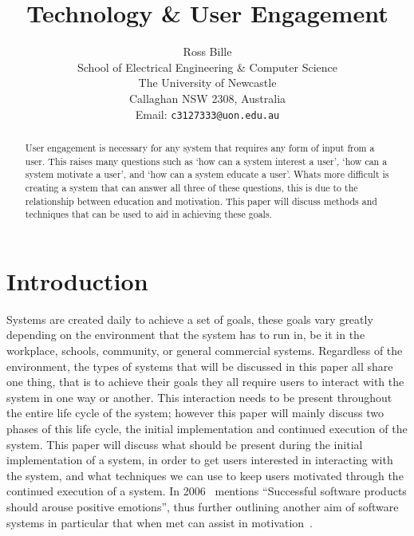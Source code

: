 \documentclass[a4paper,12pt]{article}
\begin{document}
%
\title{\bf Technology \& User Engagement}
%
\author{Ross Bille\\
School of Electrical Engineering \& Computer Science\\
The University of Newcastle\\ Callaghan NSW 2308, Australia\\
Email: \texttt{c3127333@uon.edu.au} } 
\maketitle


\newpage
\begin{abstract}%
\noindent User engagement is necessary for any system that requires any form of input from a user. 
This raises many questions such as `how can a system interest a user', `how can a system motivate a user', and `how can a system educate a user'. 
Whats more difficult is creating a system that can answer all three of these questions, this is due to the relationship between education and motivation.
This paper will discuss methods and techniques that can be used to aid in achieving these goals.
\end{abstract}

\pagebreak

\tableofcontents

\pagebreak

\listoffigures        
\listoftables

\pagebreak

\section{Introduction}
Systems are created daily to achieve a set of goals, these goals vary greatly depending on the environment that the system has to run in, be it in the workplace, schools, community, or general commercial systems.
Regardless of the environment, the types of systems that will be discussed in this paper all share one thing, that is to achieve their goals they all require users to interact with the system in one way or another. 
This interaction needs to be present throughout the entire life cycle of the system; however this paper will mainly discuss two phases of this life cycle, the initial implementation and continued execution of the system. 
This paper will discuss what should be present during the initial implementation of a system, in order to get users interested in interacting with the system, and what techniques we can use to keep users motivated through the continued execution of a system. 
In 2006~\citet[p.~1]{fun-of-use} mentions ``Successful software products should arouse positive emotions'', thus further outlining another aim of software systems in particular that when met can assist in motivation~\citep{fun-of-use}.
\end{document}
